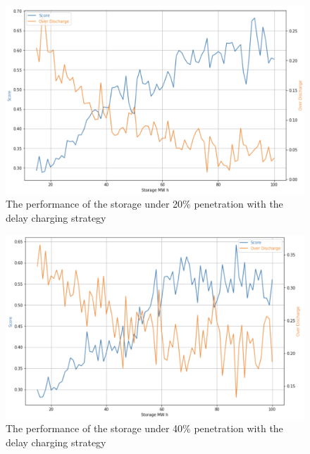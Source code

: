 \documentclass[12pt,a4paper]{report}
\begin{document}
            \begin{figure}[ht]
                \centerline{\includegraphics[scale=0.9]{simu_score_delay_20}}
                \caption{The performance of the storage under 20\% penetration with the delay charging strategy}
                \label{fig_simu_score_delay_20}
            \end{figure}

            \begin{figure}[ht]
                \centerline{\includegraphics[scale=0.9]{simu_score_delay_40}}
                \caption{The performance of the storage under 40\% penetration with the delay charging strategy}
                \label{fig_simu_score_delay_40}
            \end{figure}

\end{document}
